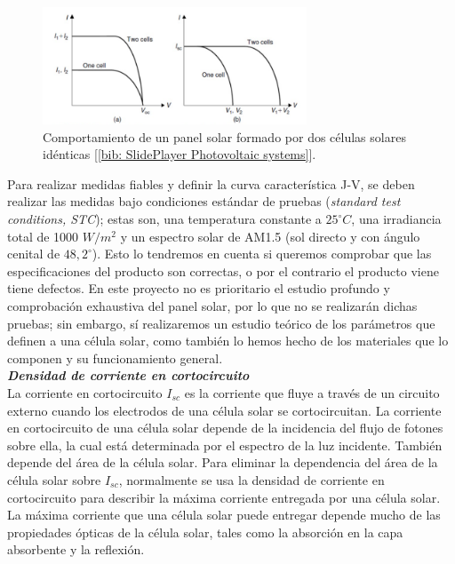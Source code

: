 \documentclass[12pt]{article}
\begin{document}
	\begin{figure}[h]
		\begin{center}
			\includegraphics[width=0.7\textwidth]{img/effectTwoIdenticalCells.png}
			\caption{Comportamiento de un panel solar formado por dos células solares idénticas [\ref{bib: SlidePlayer Photovoltaic systems}].}
			\label{fig: solar panel of identical solar cells}
		\end{center}
	\end{figure}
	

	\noindent Para realizar medidas fiables y definir la curva característica J-V, se deben realizar las medidas bajo condiciones estándar de pruebas (\textit{standard test conditions, STC}); estas son, una temperatura constante a $25^{\circ}C$, una irradiancia total de 1000 $W/ m^2$ y un espectro solar de AM1.5 (sol directo y con ángulo cenital de $48,2 ^{\circ}$). Esto lo tendremos en cuenta si queremos comprobar que las especificaciones del producto son correctas, o por el contrario el producto viene tiene defectos. En este proyecto no es prioritario el estudio profundo y comprobación exhaustiva del panel solar, por lo que no se realizarán dichas pruebas; sin embargo, sí realizaremos un estudio teórico de los parámetros que definen a una célula solar, como también lo hemos hecho de los materiales que lo componen y su funcionamiento general.\\
	
	
	\noindent \textit{\textbf{Densidad de corriente en cortocircuito}} \\
	
	\noindent La corriente en cortocircuito $I_{sc}$ es la corriente que fluye a través de un circuito externo cuando los electrodos de una célula solar se cortocircuitan. La corriente en cortocircuito de una célula solar depende de la incidencia del flujo de fotones sobre ella, la cual está determinada por el espectro de la luz incidente. También depende del área de la célula solar. Para eliminar la dependencia del área de la célula solar sobre $I_{sc}$, normalmente se usa la densidad de corriente en cortocircuito para describir la máxima corriente entregada por una célula solar. La máxima corriente que una célula solar puede entregar depende mucho de las propiedades ópticas de la célula solar, tales como la absorción en la capa absorbente y la reflexión. \\
	
\end{document}
